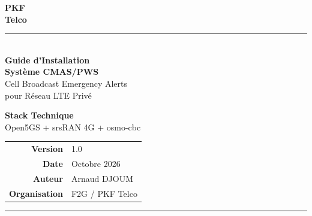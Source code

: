 \documentclass[11pt,a4paper]{article}
\begin{document}
\begin{titlepage}
    \centering
    \vspace*{1cm}
    
    {\fontsize{50}{60}\selectfont\textcolor{pkfblue}{\textbf{PKF}}}\\[0.2cm]
    {\fontsize{30}{36}\selectfont\textcolor{pkforange}{\textbf{Telco}}}\\[1.5cm]
    
    {\color{pkforange}\rule{0.6\textwidth}{3pt}}\\[1.5cm]
    
    {\Huge\bfseries\textcolor{pkfblue}{Guide d'Installation}}\\[0.5cm]
    {\Huge\bfseries\textcolor{pkfblue}{Système CMAS/PWS}}\\[1cm]
    
    {\Large\textcolor{pkfgray}{Cell Broadcast Emergency Alerts}}\\[0.3cm]
    {\Large\textcolor{pkfgray}{pour Réseau LTE Privé}}\\[2cm]
    
    \begin{tcolorbox}[
        enhanced,
        colback=codebg,
        colframe=pkfblue,
        width=0.7\textwidth,
        arc=5pt,
        boxrule=1pt
    ]
        \centering
        \textbf{Stack Technique}\\[0.3cm]
        \textcolor{pkfblue}{Open5GS} + \textcolor{pkforange}{srsRAN 4G} + \textcolor{successgreen}{osmo-cbc}
    \end{tcolorbox}
    
    \vfill
    
    \begin{tabular}{rl}
        \textcolor{pkfgray}{\textbf{Version}} & 1.0 \\[0.2cm]
        \textcolor{pkfgray}{\textbf{Date}} & Octobre 2026 \\[0.2cm]
        \textcolor{pkfgray}{\textbf{Auteur}} & Arnaud DJOUM \\[0.2cm]
        \textcolor{pkfgray}{\textbf{Organisation}} & F2G / PKF Telco \\
    \end{tabular}
    
    \vspace{1cm}
    
    {\color{pkforange}\rule{0.8\textwidth}{2pt}}
    
\end{titlepage}
\end{document}
